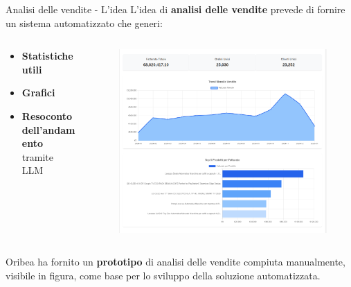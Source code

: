 \documentclass{beamer}
\begin{document}
	\begin{frame}{Analisi delle vendite - L'idea}
		L'idea di \textbf{analisi delle vendite} prevede di fornire un sistema automatizzato che generi:

		\begin{columns}
			\begin{column}{0.6\textwidth}
				\begin{itemize}
					\item \textbf{Statistiche utili}
					\item \textbf{Grafici}
					\item \textbf{Resoconto dell'andamento} tramite LLM
				\end{itemize}
			\end{column}
			\begin{column}{0.4\textwidth}
				\begin{figure}
					\centering
					\includegraphics[width=\textwidth]{Oribea - Esempio di report delle vendite.png}
				\end{figure}
			\end{column}
		\end{columns}

		\vspace{0.5em}
		Oribea ha fornito un \textbf{prototipo} di analisi delle vendite compiuta manualmente, visibile in figura, come base per lo sviluppo della soluzione automatizzata.
	\end{frame}
\end{document}
